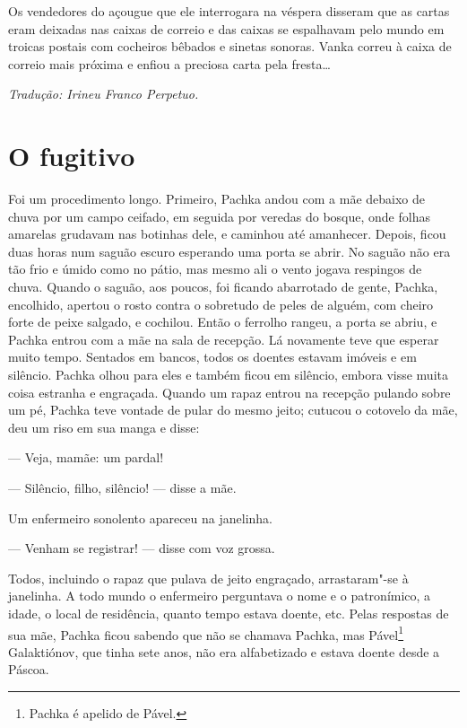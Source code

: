 Os vendedores do açougue que ele interrogara na véspera disseram que as
cartas eram deixadas nas caixas de correio e das caixas se espalhavam
pelo mundo em troicas postais com cocheiros bêbados e sinetas sonoras.
Vanka correu à caixa de correio mais próxima e enfiou a preciosa carta
pela fresta\ldots{}


\medskip

{\footnotesize\hfill\emph{Tradução: Irineu Franco Perpetuo.}}

\chapter{O fugitivo}\label{part7} \label{part7}

Foi um procedimento longo. Primeiro, Pachka andou com a mãe debaixo de
chuva por um campo ceifado, em seguida por veredas do bosque, onde
folhas amarelas grudavam nas botinhas dele, e caminhou até amanhecer.
Depois, ficou duas horas num saguão escuro esperando uma porta se abrir.
No saguão não era tão frio e úmido como no pátio, mas mesmo ali o vento
jogava respingos de chuva. Quando o saguão, aos poucos, foi ficando
abarrotado de gente, Pachka, encolhido, apertou o rosto contra o
sobretudo de peles de alguém, com cheiro forte de peixe salgado, e
cochilou. Então o ferrolho rangeu, a porta se abriu, e Pachka entrou com
a mãe na sala de recepção. Lá novamente teve que esperar muito tempo.
Sentados em bancos, todos os doentes estavam imóveis e em silêncio.
Pachka olhou para eles e também ficou em silêncio, embora visse muita
coisa estranha e engraçada. Quando um rapaz entrou na recepção pulando
sobre um pé, Pachka teve vontade de pular do mesmo jeito; cutucou o
cotovelo da mãe, deu um riso em sua manga e disse:

--- Veja, mamãe: um pardal!

--- Silêncio, filho, silêncio! --- disse a mãe.

Um enfermeiro sonolento apareceu na janelinha.

--- Venham se registrar! --- disse com voz grossa.

Todos, incluindo o rapaz que pulava de jeito engraçado, arrastaram"-se à
janelinha. A todo mundo o enfermeiro perguntava o nome e o patronímico,
a idade, o local de residência, quanto tempo estava doente, etc. Pelas
respostas de sua mãe, Pachka ficou sabendo que não se chamava Pachka,
mas Pável\footnote{Pachka é apelido de Pável.} Galaktiónov, que tinha
sete anos, não era alfabetizado e estava doente desde a Páscoa.

